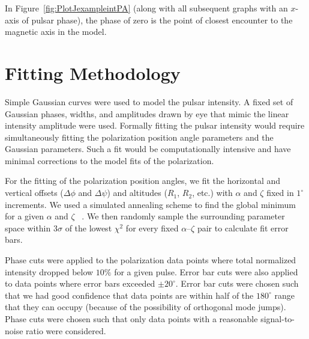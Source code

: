 In Figure~\ref{fig:PlotJexampleintPA} (along with all subsequent graphs with an $x$-axis of 
pulsar phase), the phase of zero is the point of closest encounter to the magnetic axis in 
the model.

\section{Fitting Methodology}
\label{sec:fit}

Simple Gaussian curves were used to model the pulsar intensity. A fixed set
of Gaussian phases, widths, and amplitudes drawn by eye that mimic the 
linear intensity amplitude were used.  
Formally fitting the pulsar intensity
would require simultaneously fitting the polarization position angle parameters and the 
Gaussian parameters.  Such a fit would be computationally intensive and have minimal corrections
to the model fits of the polarization. 

For the fitting of the polarization position angles, we fit the horizontal and vertical offsets 
($\Delta\phi$ and $\Delta\psi$) and altitudes ($R_{1}$, $R_{2}$, etc.) with $\alpha$ and $\zeta$ 
fixed in $1^\circ$ increments.  We used a simulated annealing scheme to find the global minimum for
a given $\alpha$ and $\zeta$ ~\citep{flannery1992numerical}.  
We then randomly sample the surrounding parameter space within $3\sigma$ of the
lowest $\chi^2$ for every fixed $\alpha$--$\zeta$ pair to calculate fit error bars.

Phase cuts were applied to the polarization data points where total normalized intensity dropped below 
$10\%$ for a given pulse. Error bar cuts were also applied to data points where error bars exceeded $\pm20^\circ$.
Error bar cuts were chosen such that we had good confidence that data points 
are within half of the $180^\circ$ range that they can occupy 
(because of the possibility of orthogonal mode jumps).  
Phase cuts were chosen such that only data points with 
a reasonable signal-to-noise ratio were considered.


